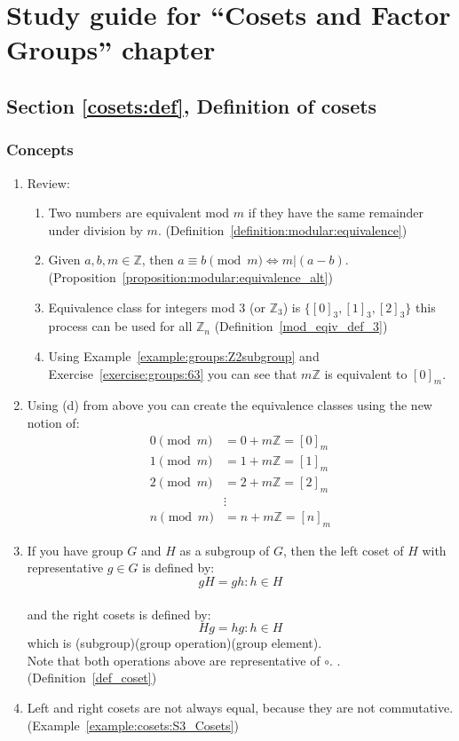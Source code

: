\section{Study guide  for ``Cosets and Factor Groups''  chapter}\label{sec:cosets:study} 


\subsection*{Section \ref{cosets:def}, Definition of cosets}
\subsubsection*{Concepts}
\begin{enumerate}
\item 
Review:
	\begin{enumerate}
	\item
	Two numbers are equivalent mod $m$ if they have the same remainder under division by $m$. (Definition~\ref{definition:modular:equivalence})
	\item
	Given $a, b, m \in {\mathbb Z}$, then $a \equiv b \pmod{m} \iff m | (a - b)$. (Proposition~\ref{proposition:modular:equivalence_alt})
	\item
	Equivalence class for integers mod 3 (or ${\mathbb Z}_3$) is $\{ [0]_3, [1]_3, [2]_3 \}$ this process can be used for all ${\mathbb Z}_n$ (Definition~\ref{mod_eqiv_def_3})
	\item
	Using Example~\ref{example:groups:Z2subgroup} and Exercise~\ref{exercise:groups:63} you can see that $m{\mathbb Z}$ is equivalent to  $[0]_m$.
	\end{enumerate}
	
\item
Using (d) from above you can create the equivalence classes using the new notion of:
	\begin{align*}
	0 \pmod{m} &= 0 + m{\mathbb Z} = [0]_m
	\\
	1 \pmod{m} &= 1 + m{\mathbb Z} = [1]_m
	\\
	2 \pmod{m} &= 2 + m{\mathbb Z} =  [2]_m
	\\
	&\vdots
	\\
	n \pmod{m} &= n + m{\mathbb Z} =  [n]_m
	\end{align*}

\item
If you have group $G$ and $H$ as a subgroup of $G$, then the left coset of $H$ with representative $g \in G$ is defined by:
\\
$$gH = {gh:h \in H}$$
\\
and the right cosets is defined by:
\\
$$Hg = {hg:h \in H}$$
which is (subgroup)(group operation)(group element).
\\
Note that both operations above are representative of $\circ$. . (Definition~\ref{def_coset})

\item
Left and right cosets are not always equal, because they are not commutative. (Example~\ref{example:cosets:S3_Cosets})
\end{enumerate}

